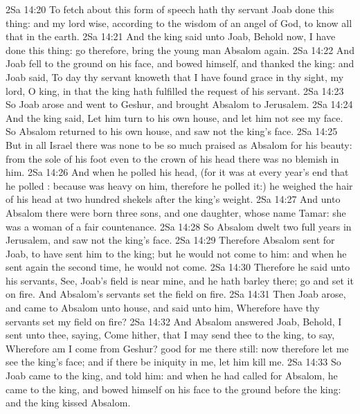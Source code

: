 \vs 2Sa 14:20 To fetch about this form of speech hath thy servant Joab done this thing: and my lord  wise, according to the wisdom of an angel of God, to know all  that  in the earth.
\vs 2Sa 14:21 And the king said unto Joab, Behold now, I have done this thing: go therefore, bring the young man Absalom again.
\vs 2Sa 14:22 And Joab fell to the ground on his face, and bowed himself, and thanked the king: and Joab said, To day thy servant knoweth that I have found grace in thy sight, my lord, O king, in that the king hath fulfilled the request of his servant.
\vs 2Sa 14:23 So Joab arose and went to Geshur, and brought Absalom to Jerusalem.
\vs 2Sa 14:24 And the king said, Let him turn to his own house, and let him not see my face. So Absalom returned to his own house, and saw not the king's face.
\vs 2Sa 14:25 But in all Israel there was none to be so much praised as Absalom for his beauty: from the sole of his foot even to the crown of his head there was no blemish in him.
\vs 2Sa 14:26 And when he polled his head, (for it was at every year's end that he polled : because  was heavy on him, therefore he polled it:) he weighed the hair of his head at two hundred shekels after the king's weight.
\vs 2Sa 14:27 And unto Absalom there were born three sons, and one daughter, whose name  Tamar: she was a woman of a fair countenance.
\vs 2Sa 14:28 So Absalom dwelt two full years in Jerusalem, and saw not the king's face.
\vs 2Sa 14:29 Therefore Absalom sent for Joab, to have sent him to the king; but he would not come to him: and when he sent again the second time, he would not come.
\vs 2Sa 14:30 Therefore he said unto his servants, See, Joab's field is near mine, and he hath barley there; go and set it on fire. And Absalom's servants set the field on fire.
\vs 2Sa 14:31 Then Joab arose, and came to Absalom unto  house, and said unto him, Wherefore have thy servants set my field on fire?
\vs 2Sa 14:32 And Absalom answered Joab, Behold, I sent unto thee, saying, Come hither, that I may send thee to the king, to say, Wherefore am I come from Geshur?  good for me  there still: now therefore let me see the king's face; and if there be  iniquity in me, let him kill me.
\vs 2Sa 14:33 So Joab came to the king, and told him: and when he had called for Absalom, he came to the king, and bowed himself on his face to the ground before the king: and the king kissed Absalom.
